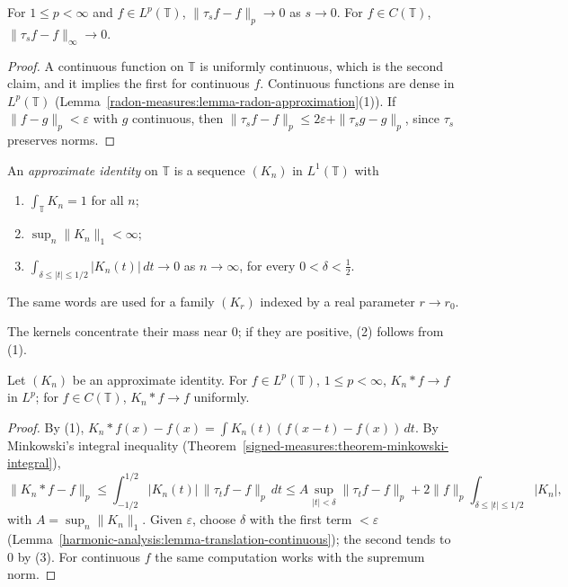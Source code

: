 \begin{lemma}\label{harmonic-analysis:lemma-translation-continuous}
For $1 \leq p < \infty$ and $f \in L^p(\mathbb{T})$, $\|\tau_sf - f\|_p \to 0$ as $s \to 0$. For $f \in C(\mathbb{T})$, $\|\tau_sf - f\|_\infty \to 0$.
\end{lemma}

\begin{proof}
A continuous function on $\mathbb{T}$ is uniformly continuous, which is the second claim, and it implies the first for continuous $f$. Continuous functions are dense in $L^p(\mathbb{T})$
(Lemma~\ref{radon-measures:lemma-radon-approximation}(1)). If $\|f - g\|_p < \varepsilon$ with $g$ continuous, then $\|\tau_sf - f\|_p \leq 2\varepsilon + \|\tau_sg - g\|_p$, since $\tau_s$ preserves norms.
\end{proof}

\begin{definition}\label{harmonic-analysis:definition-approximate-identity}
An \emph{approximate identity} on $\mathbb{T}$ is a sequence $(K_n)$ in $L^1(\mathbb{T})$ with
\begin{enumerate}
\item $\int_\mathbb{T}K_n = 1$ for all $n$;
\item $\sup_n\|K_n\|_1 < \infty$;
\item $\int_{\delta \leq |t| \leq 1/2}|K_n(t)|\,dt \to 0$ as $n \to \infty$, for every $0 < \delta < \frac12$.
\end{enumerate}
The same words are used for a family $(K_r)$ indexed by a real parameter $r \to r_0$.
\end{definition}

The kernels concentrate their mass near $0$; if they are positive, (2) follows from (1).

\begin{theorem}\label{harmonic-analysis:theorem-approximate-identity}
Let $(K_n)$ be an approximate identity. For $f \in L^p(\mathbb{T})$, $1 \leq p < \infty$, $K_n * f \to f$ in $L^p$; for $f \in C(\mathbb{T})$, $K_n * f \to f$ uniformly.
\end{theorem}

\begin{proof}
By (1), $K_n * f(x) - f(x) = \int K_n(t)(f(x - t) - f(x))\,dt$. By Minkowski's integral inequality (Theorem~\ref{signed-measures:theorem-minkowski-integral}),
\[
\|K_n * f - f\|_p \leq \int_{-1/2}^{1/2}|K_n(t)|\,\|\tau_tf - f\|_p\,dt \leq A\sup_{|t| < \delta}\|\tau_tf - f\|_p + 2\|f\|_p\int_{\delta \leq |t| \leq 1/2}|K_n|,
\]
with $A = \sup_n\|K_n\|_1$. Given $\varepsilon$, choose $\delta$ with the first term $< \varepsilon$ (Lemma~\ref{harmonic-analysis:lemma-translation-continuous}); the second tends to $0$ by (3). For continuous $f$ the same computation
works with the supremum norm.
\end{proof}

